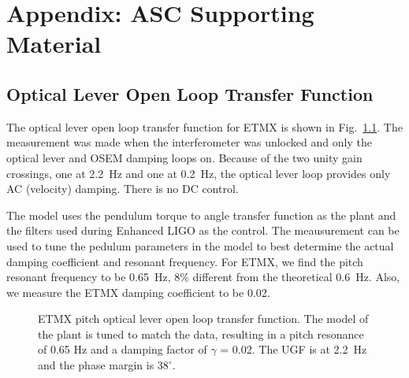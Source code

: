 \chapter{Appendix: ASC Supporting Material}



\section{Optical Lever Open Loop Transfer Function}
\label{sec:oplevOLG}
The optical lever open loop transfer function for ETMX is shown in
Fig.~\ref{fig:oplevOLG}. The measurement was made when the
interferometer was unlocked and only the optical lever and OSEM
damping loops on. Because of the two unity gain crossings, one at
2.2~Hz and one at 0.2~Hz, the optical lever loop provides only AC
(velocity) damping. There is no DC control. 

The model uses the pendulum torque to angle transfer function as the
plant and the filters used during Enhanced LIGO as the control. The
meausurement can be used to tune the pedulum parameters in the model
to best determine the actual damping coefficient and resonant
frequency. For ETMX, we find the pitch resonant frequency to be
0.65~Hz, 8\% different from the theoretical 0.6~Hz. Also, we measure
the ETMX damping coefficient to be 0.02. 


\begin{figure}
\begin{centering}
\caption[Optical lever open loop transfer function]{ETMX pitch optical
  lever open loop transfer function. The model of the plant is tuned
  to match the data, resulting in a pitch resonance of 0.65 Hz and a
  damping factor of $\gamma$ = 0.02. The UGF is at 2.2~Hz and the
  phase margin is $38^\circ$.}
\label{fig:oplevOLG}
\end{centering}
\end{figure}





